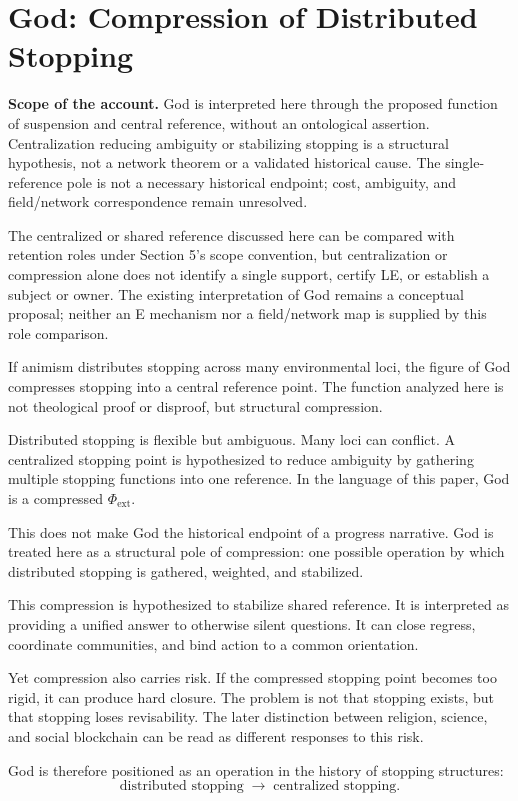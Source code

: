 \section{God: Compression of Distributed Stopping}

\noindent\textbf{Scope of the account.} God is interpreted here through the proposed function of suspension and central reference, without an ontological assertion. Centralization reducing ambiguity or stabilizing stopping is a structural hypothesis, not a network theorem or a validated historical cause. The single-reference pole is not a necessary historical endpoint; cost, ambiguity, and field/network correspondence remain unresolved.

The centralized or shared reference discussed here can be compared with retention roles under Section 5's scope convention, but centralization or compression alone does not identify a single support, certify LE, or establish a subject or owner. The existing interpretation of God remains a conceptual proposal; neither an E mechanism nor a field/network map is supplied by this role comparison.


If animism distributes stopping across many environmental loci, the figure of God compresses stopping into a central reference point. The function analyzed here is not theological proof or disproof, but structural compression.

Distributed stopping is flexible but ambiguous. Many loci can conflict. A centralized stopping point is hypothesized to reduce ambiguity by gathering multiple stopping functions into one reference. In the language of this paper, God is a compressed $\Phi_{\text{ext}}$.

This does not make God the historical endpoint of a progress narrative. God is treated here as a structural pole of compression: one possible operation by which distributed stopping is gathered, weighted, and stabilized.

This compression is hypothesized to stabilize shared reference. It is interpreted as providing a unified answer to otherwise silent questions. It can close regress, coordinate communities, and bind action to a common orientation.

Yet compression also carries risk. If the compressed stopping point becomes too rigid, it can produce hard closure. The problem is not that stopping exists, but that stopping loses revisability. The later distinction between religion, science, and social blockchain can be read as different responses to this risk.

God is therefore positioned as an operation in the history of stopping structures:
\[
\text{distributed stopping} \;\longrightarrow\; \text{centralized stopping}.
\]

\bigskip
